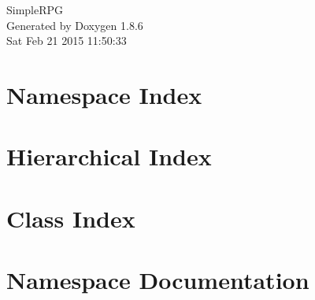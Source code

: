 \documentclass[twoside]{book}
\newcommand{\clearemptydoublepage}{%
  \newpage{\pagestyle{empty}\cleardoublepage}%
}
\begin{document}
\hypersetup{pageanchor=false}
\begin{titlepage}
\vspace*{7cm}
\begin{center}%
{\Large Simple\-R\-P\-G }\\
\vspace*{1cm}
{\large Generated by Doxygen 1.8.6}\\
\vspace*{0.5cm}
{\small Sat Feb 21 2015 11:50:33}\\
\end{center}
\end{titlepage}
\clearemptydoublepage
\tableofcontents
\clearemptydoublepage
{}
\hypersetup{pageanchor=true}

\chapter{Namespace Index}

\chapter{Hierarchical Index}

\chapter{Class Index}

\chapter{Namespace Documentation}






\end{document}
